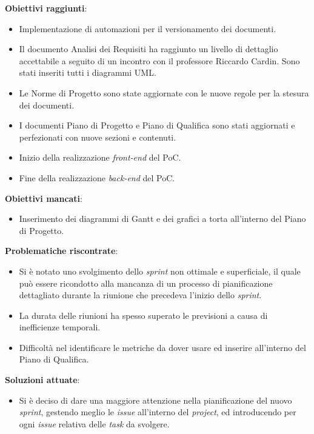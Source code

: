 \textbf{Obiettivi raggiunti}:
\begin{itemize}
	\item Implementazione di automazioni per il versionamento dei documenti.
	\item Il documento Analisi dei Requisiti ha raggiunto un livello di dettaglio accettabile a seguito di un incontro con il professore Riccardo Cardin.
	      Sono stati inseriti tutti i diagrammi UML\g.
	\item Le Norme di Progetto sono state aggiornate con le nuove regole per la stesura dei documenti.
	\item I documenti Piano di Progetto e Piano di Qualifica sono stati aggiornati e perfezionati con nuove sezioni e contenuti.
	\item Inizio della realizzazione \textit{front-end} del PoC.
	\item Fine della realizzazione \textit{back-end} del PoC.
\end{itemize}

\textbf{Obiettivi mancati}:
\begin{itemize}
	\item Inserimento dei diagrammi di Gantt e dei grafici a torta all'interno del Piano di Progetto.
\end{itemize}

\textbf{Problematiche riscontrate}:
\begin{itemize}
	\item Si è notato uno svolgimento dello \textit{sprint} non ottimale e superficiale, il quale può essere ricondotto alla mancanza di un processo di pianificazione
	      dettagliato durante la riunione che precedeva l'inizio dello \textit{sprint}.
	\item La durata delle riunioni ha spesso superato le previsioni a causa di inefficienze temporali.
	\item Difficoltà nel identificare le metriche da dover usare ed inserire all'interno del Piano di Qualifica.
\end{itemize}

\textbf{Soluzioni attuate}:
\begin{itemize}
	\item Si è deciso di dare una maggiore attenzione nella pianificazione del nuovo \textit{sprint}, gestendo meglio le \textit{issue} all'interno del \textit{project}, ed introducendo per ogni
	      \textit{issue} relativa delle \textit{task} da svolgere.
\end{itemize}




